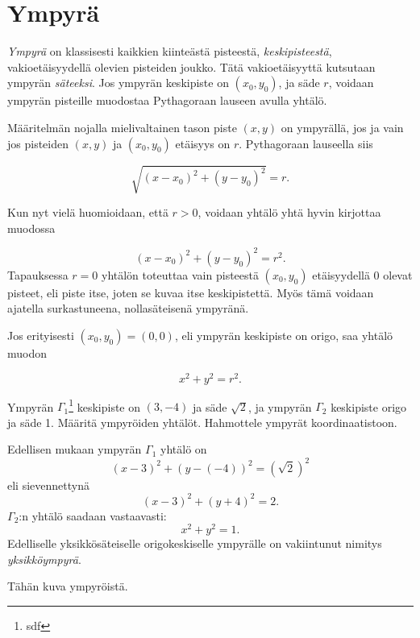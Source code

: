 \section{Ympyrä}


\emph{Ympyrä} on klassisesti kaikkien kiinteästä pisteestä, \emph{keskipisteestä}, vakioetäisyydellä olevien pisteiden joukko. Tätä vakioetäisyyttä kutsutaan ympyrän \emph{säteeksi}. Jos ympyrän keskipiste on $(x_{0},y_{0})$, ja säde $r$, voidaan ympyrän pisteille muodostaa Pythagoraan lauseen avulla yhtälö.

Määritelmän nojalla mielivaltainen tason piste $(x,y)$ on ympyrällä, jos ja vain jos pisteiden $(x,y)$ ja $(x_{0},y_{0})$ etäisyys on $r$. Pythagoraan lauseella siis

\[
\sqrt{(x-x_{0})^{2}+(y-y_{0})^{2}} = r.
\]

Kun nyt vielä huomioidaan, että $r > 0$, voidaan yhtälö yhtä hyvin kirjottaa muodossa

\[
(x-x_{0})^{2}+(y-y_{0})^{2} = r^{2}.
\]
Tapauksessa $r=0$ yhtälön toteuttaa vain pisteestä $(x_{0},y_{0})$ etäisyydellä 0 olevat pisteet, eli piste itse, joten se kuvaa itse keskipistettä. Myös tämä voidaan ajatella surkastuneena, nollasäteisenä ympyränä.

Jos erityisesti $(x_{0},y_{0})= (0,0)$, eli ympyrän keskipiste on origo, saa yhtälö muodon

\[
x^{2}+y^{2} = r^{2}.
\]


\begin{esimerkki}
Ympyrän $\Gamma_{1}$\footnote{sdf} keskipiste on $(3,-4)$ ja säde $\sqrt{2}$, ja ympyrän $\Gamma_{2}$ keskipiste origo ja säde 1. Määritä ympyröiden yhtälöt. Hahmottele ympyrät koordinaatistoon.

\begin{esimratk}
Edellisen mukaan ympyrän $\Gamma_{1}$ yhtälö on
\[
(x-3)^{2}+(y-(-4))^{2} = (\sqrt{2})^{2}
\]
eli sievennettynä
\[
(x-3)^{2}+(y+4)^{2} = 2.
\]
$\Gamma_{2}$:n yhtälö saadaan vastaavasti:
\[
x^{2}+y^{2} = 1.
\]
Edelliselle yksikkösäteiselle origokeskiselle ympyrälle on vakiintunut nimitys \emph{yksikköympyrä}.

Tähän kuva ympyröistä.

\end{esimratk}
\end{esimerkki}

